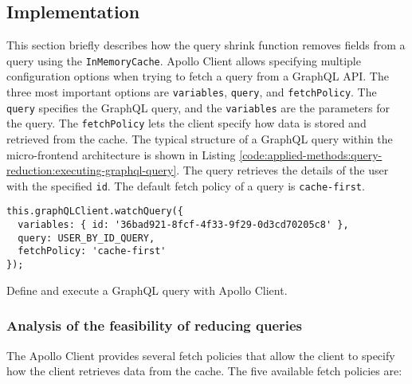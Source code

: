 \subsection{Implementation}\label{subsection:applied-methods:query-reduction:how-does-the-library-work}

This section briefly describes how the query shrink function removes fields from a query using the \texttt{InMemoryCache}. Apollo Client allows specifying multiple configuration options when trying to fetch a query from a GraphQL \ac{API}. The three most important options are \texttt{variables}, \texttt{query}, and \texttt{fetchPolicy}. The \texttt{query} specifies the GraphQL query, and the \texttt{variables} are the parameters for the query. The \texttt{fetchPolicy} lets the client specify how data is stored and retrieved from the cache. The typical structure of a GraphQL query within the micro-frontend architecture is shown in Listing \ref{code:applied-methods:query-reduction:executing-graphql-query}. The query retrieves the details of the user with the specified \texttt{id}. The default fetch policy of a query is \texttt{cache-first}.   

\ifshowListings
  \begin{listing}[H]
  \begin{verbatim}
this.graphQLClient.watchQuery({
  variables: { id: '36bad921-8fcf-4f33-9f29-0d3cd70205c8' },
  query: USER_BY_ID_QUERY,
  fetchPolicy: 'cache-first'
});
  \end{verbatim}
  \caption{Define and execute a GraphQL query with Apollo Client.}\label{code:applied-methods:query-reduction:executing-graphql-query}
  \end{listing}
\fi

\subsubsection{Analysis of the feasibility of reducing queries}

The Apollo Client provides several fetch policies that allow the client to specify how the client retrieves data from the cache. The five available fetch policies are: \cite{misc:-:applied-methods:query-reduction:apollo-client:queries}

